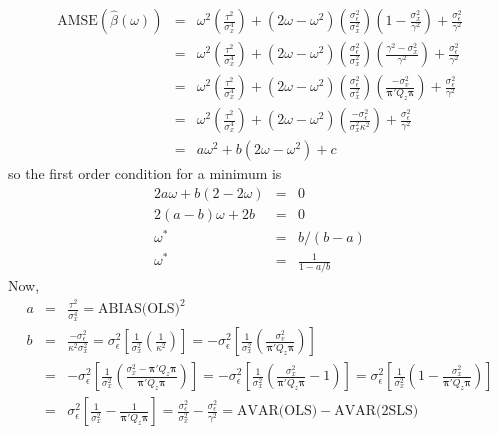 \documentclass[12pt]{article}
\theoremstyle{definition}
\begin{document}
    \begin{eqnarray*}
      \mbox{AMSE}\left(\widehat{\beta}(\omega)\right) &=& \omega^2 \left(\frac{\tau^2}{\sigma_x^4} \right) + (2\omega - \omega^2)\left(\frac{\sigma_\epsilon^2}{\sigma_x^2}\right)\left( 1 - \frac{\sigma_x^2}{\gamma^2}\right) + \frac{\sigma_\epsilon^2}{\gamma^2}\\
      &=& \omega^2 \left(\frac{\tau^2}{\sigma_x^4} \right) + (2\omega - \omega^2)\left(\frac{\sigma_\epsilon^2}{\sigma_x^2}\right)\left(\frac{\gamma^2 - \sigma_x^2}{\gamma^2}\right) + \frac{\sigma_\epsilon^2}{\gamma^2}\\
      &=& \omega^2 \left(\frac{\tau^2}{\sigma_x^4} \right) + (2\omega - \omega^2)\left(\frac{\sigma_\epsilon^2}{\sigma_x^2}\right)\left(\frac{-\sigma_v^2}{\boldsymbol{\pi}'Q_z\boldsymbol{\pi}}\right) + \frac{\sigma_\epsilon^2}{\gamma^2}\\
      &=& \omega^2 \left(\frac{\tau^2}{\sigma_x^4} \right) + (2\omega - \omega^2)\left(\frac{-\sigma_\epsilon^2}{\sigma_x^2\kappa^2}\right)+ \frac{\sigma_\epsilon^2}{\gamma^2}\\
        &=& a\omega^2 + b(2\omega - \omega^2) + c
    \end{eqnarray*}
  so the first order condition for a minimum is
    \begin{eqnarray*}
      2a\omega + b(2 - 2\omega) &=&0\\
      2(a-b) \omega + 2b &=& 0\\
      \omega^* &=& b/(b-a)\\
      \omega^* &=& \frac{1}{1 - a/b}
    \end{eqnarray*}
    Now, 
    \begin{eqnarray*}
       a &=&\frac{\tau^2}{\sigma_x^4} = \mbox{ABIAS(OLS)}^2 \\
       b &=& \frac{-\sigma_\epsilon^2}{\kappa^2 \sigma_x^2} = \sigma_\epsilon^2\left[ \frac{1}{\sigma_x^2} \left(\frac{1}{\kappa^2}\right)\right] = - \sigma_\epsilon^2\left[ \frac{1}{\sigma_x^2} \left(\frac{\sigma_v^2}{\boldsymbol{\pi}'Q_z \boldsymbol{\pi}}\right)\right] \\
          &=& - \sigma_\epsilon^2\left[ \frac{1}{\sigma_x^2} \left(\frac{\sigma_x^2 - \boldsymbol{\pi}'Q_z \boldsymbol{\pi}}{\boldsymbol{\pi}'Q_z \boldsymbol{\pi}}\right)\right]=-\sigma_\epsilon^2\left[ \frac{1}{\sigma_x^2} \left(\frac{\sigma_x^2 }{\boldsymbol{\pi}'Q_z \boldsymbol{\pi}}-1\right)\right]=\sigma_\epsilon^2\left[ \frac{1}{\sigma_x^2} \left(1-\frac{\sigma_x^2 }{\boldsymbol{\pi}'Q_z \boldsymbol{\pi}}\right)\right]\\
          &=&\sigma_\epsilon^2\left[  \frac{1}{\sigma_x^2}-\frac{1}{\boldsymbol{\pi}'Q_z \boldsymbol{\pi}}\right] =  \frac{\sigma_\epsilon^2}{\sigma_x^2}-\frac{\sigma_\epsilon^2}{\gamma^2}  = \mbox{AVAR(OLS)}-\mbox{AVAR(2SLS)}
     \end{eqnarray*} 
\end{document}
